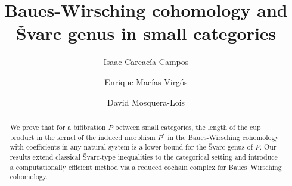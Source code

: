 \documentclass[12pt,reqno]{amsart}
\theoremstyle{definition}
\theoremstyle{remark}
\numberwithin{figure}{section}%
\begin{document}
\title[Cohomology and \v{S}varc genus]{Baues-Wirsching cohomology and\\ \v{S}varc genus in small categories}




\author[I. Carcac\'ia]{%
	Isaac Carcac\'ia-Campos %
}


		
 \address{%
           	Isaac Carcac\'ia-Campos
            \\
              CITMAga,Departamento de Matem\'aticas, Universidade de Santiago de Compostela, 15782-SPAIN}



\author[E. Mac\'ias]{%
	Enrique Mac\'ias-Virg\'os %
}


		
 \address{%
           	Enrique Mac\'ias-Virg\'os \\
              CITMAga, Departamento de Matem\'aticas, Universidade de Santiago de Compostela, 15782-SPAIN}


\author[D. Mosquera]{%
	David Mosquera-Lois %
}


		
 \address{%
           	David Mosquera-Lois \\
              Departamento de Matemáticas, Universidade de Vigo, 15782-SPAIN}





\begin{abstract} We prove that for a bifibration 
$P$ between small categories, the length of the cup product in the kernel of the induced morphism ${P^*}$ in the Baues-Wirsching cohomology with coefficients in any natural system is a lower bound for the
\v{S}varc genus of $P$. Our results extend classical \v{S}varc-type inequalities to the categorical setting and introduce a computationally efficient method via a reduced cochain complex for Baues–Wirsching cohomology.
\end{abstract}
\end{document}
